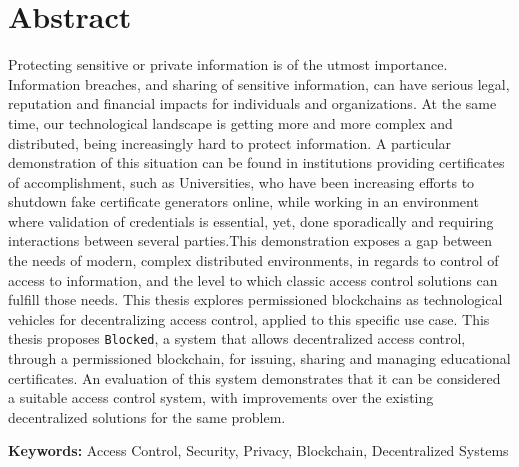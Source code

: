 \section*{Abstract}

Protecting sensitive or private information is of the utmost importance. Information breaches, and sharing of sensitive information, can have serious legal, reputation and financial impacts for individuals and organizations. At the same time, our technological landscape is getting more and more complex and distributed, being increasingly hard to protect information. A particular demonstration of this situation can be found in institutions providing certificates of accomplishment, such as Universities, who have been increasing efforts to shutdown fake certificate generators online, while working in an environment where validation of credentials is essential, yet, done sporadically and requiring interactions between several parties.This demonstration exposes a gap between the needs of modern, complex distributed environments, in regards to control of access to information, and the level to which classic access control solutions can fulfill those needs. This thesis explores permissioned blockchains as technological vehicles for decentralizing access control, applied to this specific use case. This thesis proposes \texttt{Blocked}, a system that allows decentralized access control, through a permissioned blockchain, for issuing, sharing and managing educational certificates. An evaluation of this system demonstrates that it can be considered a suitable access control system, with improvements over the existing decentralized solutions for the same problem.

\vfill

\noindent \textbf{Keywords:} Access Control, Security, Privacy, Blockchain, Decentralized Systems
